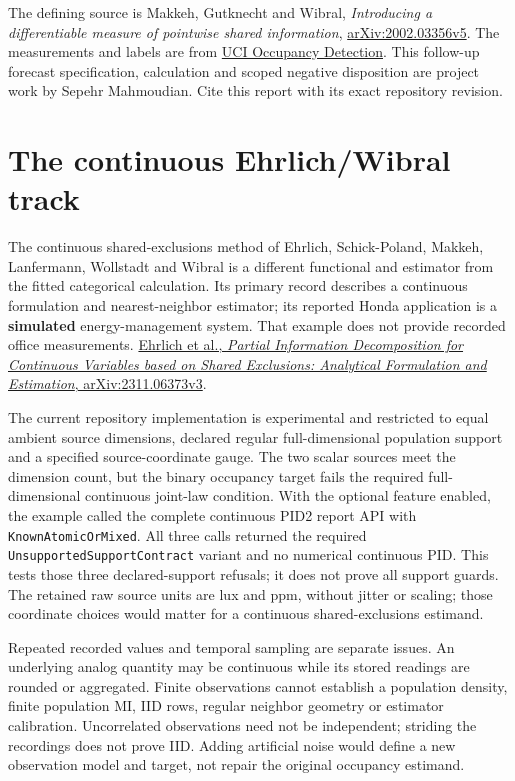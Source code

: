 The defining source is Makkeh, Gutknecht and Wibral, \emph{Introducing a differentiable measure of pointwise shared information}, \href{https://arxiv.org/abs/2002.03356v5}{arXiv:2002.03356v5}. The measurements and labels are from \href{https://doi.org/10.24432/C5X01N}{UCI Occupancy Detection}. This follow-up forecast specification, calculation and scoped negative disposition are project work by Sepehr Mahmoudian. Cite this report with its exact repository revision.

\par{}

\section{The continuous Ehrlich/Wibral track}\label{the-continuous-ehrlichwibral-track}

The continuous shared-exclusions method of Ehrlich, Schick-Poland, Makkeh, Lanfermann, Wollstadt and Wibral is a different functional and estimator from the fitted categorical calculation. Its primary record describes a continuous formulation and nearest-neighbor estimator; its reported Honda application is a \textbf{simulated} energy-management system. That example does not provide recorded office measurements. \href{https://arxiv.org/abs/2311.06373v3}{Ehrlich et al., \emph{Partial Information Decomposition for Continuous Variables based on Shared Exclusions: Analytical Formulation and Estimation}, arXiv:2311.06373v3}.

The current repository implementation is experimental and restricted to equal ambient source dimensions, declared regular full-dimensional population support and a specified source-coordinate gauge. The two scalar sources meet the dimension count, but the binary occupancy target fails the required full-dimensional continuous joint-law condition. With the optional feature enabled, the example called the complete continuous PID2 report API with \texttt{KnownAtomicOrMixed}. All three calls returned the required \texttt{UnsupportedSupportContract} variant and no numerical continuous PID. This tests those three declared-support refusals; it does not prove all support guards. The retained raw source units are lux and ppm, without jitter or scaling; those coordinate choices would matter for a continuous shared-exclusions estimand.

Repeated recorded values and temporal sampling are separate issues. An underlying analog quantity may be continuous while its stored readings are rounded or aggregated. Finite observations cannot establish a population density, finite population MI, IID rows, regular neighbor geometry or estimator calibration. Uncorrelated observations need not be independent; striding the recordings does not prove IID. Adding artificial noise would define a new observation model and target, not repair the original occupancy estimand.

